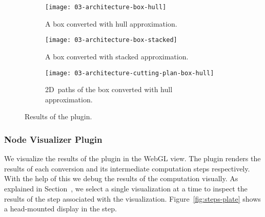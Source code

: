 \documentclass[../../ClassicThesis.tex]{subfiles}
\begin{document}
\begin{figure}[h]
  \centering
  \begin{subfigure}[a]{0.3222\textwidth}
    \texttt{[image: 03-architecture-box-hull]}
    \caption{A box converted with hull approximation.}
    \label{fig:conversion:plate}
  \end{subfigure}
  \begin{subfigure}[b]{0.3222\textwidth}
    \texttt{[image: 03-architecture-box-stacked]}
    \caption{A box converted with stacked approximation.}
    \label{fig:conversion:stacked}
  \end{subfigure}
  \begin{subfigure}[c]{0.3222\textwidth}
    \texttt{[image: 03-architecture-cutting-plan-box-hull]}
    \caption{2D~paths of the box converted with hull approximation.}
    \label{fig:conversion:paths}
  \end{subfigure}
  \caption{Results of the  plugin.}
  \label{fig:conversion}
\end{figure}


\subsubsection{Node Visualizer Plugin}

We visualize the results of the 
plugin in the WebGL view. The  plugin
renders the results of each conversion and its intermediate
computation steps respectively. With the help of this we
debug the results of the computation visually. As explained
in Section~, we select a
single visualization at a time to inspect the results of the
step associated with the visualization.
Figure~\ref{fig:steps-plate} shows a head-mounted display in
the  step.
\end{document}
